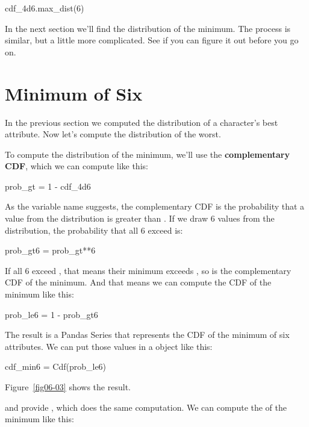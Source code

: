 \documentclass[12pt]{book}
\theoremstyle{exercise}
\begin{document}
\begin{code}
cdf_4d6.max_dist(6)
\end{code}

In the next section we'll find the distribution of the minimum.
The process is similar, but a little more complicated.
See if you can figure it out before you go on.




%
%

\section{Minimum of Six}

In the previous section we computed the distribution of a character's best attribute.
Now let's compute the distribution of the worst.

To compute the distribution of the minimum, we'll use the {\bf complementary CDF}, which we can compute like this:

\begin{code}
prob_gt = 1 - cdf_4d6
\end{code}

As the variable name suggests, the complementary CDF is the probability that a value from the distribution is greater than .
If we draw 6 values from the distribution, the probability that all 6 exceed  is:

\begin{code}
prob_gt6 = prob_gt**6
\end{code}

If all 6 exceed , that means their minimum exceeds , so  is the complementary CDF of the minimum.
And that means we can compute the CDF of the minimum like this:

\begin{code}
prob_le6 = 1 - prob_gt6
\end{code}

The result is a Pandas Series that represents the CDF of the minimum of six attributes.  
We can put those values in a  object like this:

\begin{code}
cdf_min6 = Cdf(prob_le6)
\end{code}

Figure~\ref{fig06-03} shows the result.

 and  provide , which does the same computation.
We can compute the  of the minimum like this:
\end{document}
